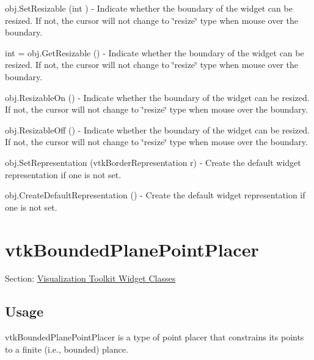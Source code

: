 \begin{DoxyItemize}
\item {\ttfamily obj.\-Set\-Resizable (int )} -\/ Indicate whether the boundary of the widget can be resized. If not, the cursor will not change to \char`\"{}resize\char`\"{} type when mouse over the boundary.  
\item {\ttfamily int = obj.\-Get\-Resizable ()} -\/ Indicate whether the boundary of the widget can be resized. If not, the cursor will not change to \char`\"{}resize\char`\"{} type when mouse over the boundary.  
\item {\ttfamily obj.\-Resizable\-On ()} -\/ Indicate whether the boundary of the widget can be resized. If not, the cursor will not change to \char`\"{}resize\char`\"{} type when mouse over the boundary.  
\item {\ttfamily obj.\-Resizable\-Off ()} -\/ Indicate whether the boundary of the widget can be resized. If not, the cursor will not change to \char`\"{}resize\char`\"{} type when mouse over the boundary.  
\item {\ttfamily obj.\-Set\-Representation (vtk\-Border\-Representation r)} -\/ Create the default widget representation if one is not set.  
\item {\ttfamily obj.\-Create\-Default\-Representation ()} -\/ Create the default widget representation if one is not set.  
\end{DoxyItemize}\hypertarget{vtkwidgets_vtkboundedplanepointplacer}{}\section{vtk\-Bounded\-Plane\-Point\-Placer}\label{vtkwidgets_vtkboundedplanepointplacer}
Section\-: \hyperlink{sec_vtkwidgets}{Visualization Toolkit Widget Classes} \hypertarget{vtkwidgets_vtkxyplotwidget_Usage}{}\subsection{Usage}\label{vtkwidgets_vtkxyplotwidget_Usage}
vtk\-Bounded\-Plane\-Point\-Placer is a type of point placer that constrains its points to a finite (i.\-e., bounded) plance.

